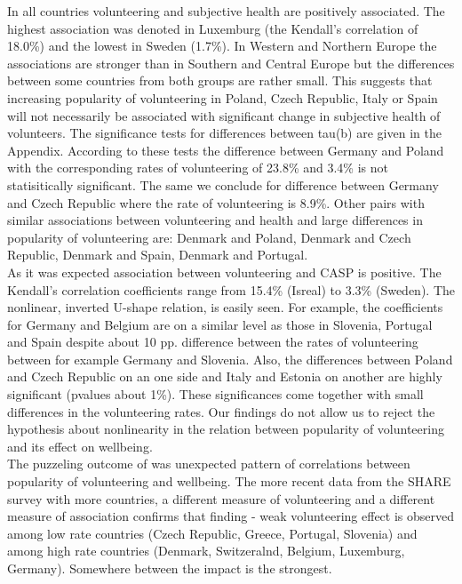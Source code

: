 \documentclass[10pt, letterpaper]{article}
\begin{document}
\begin{spacing}{1.4}
%


In all countries volunteering and subjective health are positively associated. The highest association was denoted in Luxemburg (the Kendall's correlation of 18.0\%) and the lowest in Sweden (1.7\%). In Western and Northern Europe the associations are stronger than in Southern and Central Europe but the differences between some countries from both groups are rather small. This suggests that increasing popularity of volunteering in Poland, Czech Republic, Italy or Spain will not necessarily be associated with significant change in subjective health of volunteers. The significance tests for differences between tau(b) are given in the Appendix. According to these tests the difference between Germany and Poland with the corresponding rates of volunteering of 23.8\% and 3.4\% is not statisitically significant. The same we conclude for difference between Germany and Czech Republic where the rate of volunteering is 8.9\%. Other pairs with similar associations between volunteering and health and large differences in popularity of volunteering are: Denmark and Poland, Denmark and Czech Republic, Denmark and Spain, Denmark and Portugal.  \\


As it was expected association between volunteering and CASP  is positive. The Kendall's correlation coefficients range from 15.4\% (Isreal) to 3.3\% (Sweden).  The nonlinear, inverted U-shape relation, is easily seen. For example, the coefficients for Germany and Belgium are on a similar level as those in Slovenia, Portugal and Spain despite about 10 pp. difference between the rates of volunteering between for example Germany and Slovenia. Also, the differences between Poland and Czech Republic on an one side and Italy and Estonia on another are highly significant (pvalues about 1\%). These significances come together with small differences in the volunteering rates. Our findings do not allow us to reject the hypothesis about nonlinearity in the relation between popularity of volunteering and its effect on wellbeing. \\

The puzzeling outcome of \citet{haski09} was unexpected pattern of correlations between  popularity of volunteering and wellbeing.  The more recent data from the SHARE survey with more countries, a different measure of volunteering and a different measure of association confirms that finding - weak volunteering effect is observed among low rate countries (Czech Republic, Greece, Portugal, Slovenia) and among high rate countries (Denmark, Switzeralnd, Belgium, Luxemburg, Germany). Somewhere between the impact is the strongest. \\


\end{spacing}
\end{document}
